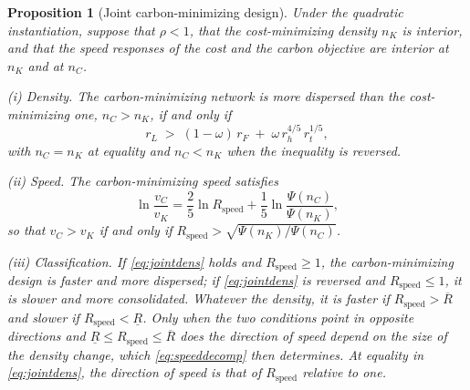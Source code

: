 \documentclass[11pt]{article}
\newtheorem{proposition}{Proposition}
\theoremstyle{definition}
\theoremstyle{remark}
\theoremstyle{plain}
\begin{document}
\begin{proposition}[Joint carbon-minimizing design]\label{prop:classify}
Under the quadratic instantiation, suppose that $\rho<1$, that the cost-minimizing density $n_K$ is interior,
and that the speed responses of the cost and the carbon objective are interior at $n_K$ and at $n_C$.

\smallskip\noindent\textup{(i)} \emph{Density.} The carbon-minimizing network is more dispersed than the
cost-minimizing one, $n_C>n_K$, if and only if
\begin{equation}\label{eq:jointdens}
  r_L\;>\;(1-\omega)\,r_F\;+\;\omega\,r_h^{4/5}\,r_t^{1/5},
\end{equation}
with $n_C=n_K$ at equality and $n_C<n_K$ when the inequality is reversed.

\smallskip\noindent\textup{(ii)} \emph{Speed.} The carbon-minimizing speed satisfies
\begin{equation}\label{eq:speeddecomp}
  \ln\frac{v_C}{v_K}=\frac25\ln R_{\mathrm{speed}}+\frac15\ln\frac{\Psi(n_C)}{\Psi(n_K)},
\end{equation}
so that $v_C>v_K$ if and only if $R_{\mathrm{speed}}>\sqrt{\Psi(n_K)/\Psi(n_C)}$.

\smallskip\noindent\textup{(iii)} \emph{Classification.} If \eqref{eq:jointdens} holds and
$R_{\mathrm{speed}}\ge1$, the carbon-minimizing design is faster and more dispersed; if \eqref{eq:jointdens} is
reversed and $R_{\mathrm{speed}}\le1$, it is slower and more consolidated. Whatever the density, it is faster
if $R_{\mathrm{speed}}>\overline R$ and slower if $R_{\mathrm{speed}}<\underline R$. Only when the two
conditions point in opposite directions and $\underline R\le R_{\mathrm{speed}}\le\overline R$ does the
direction of speed depend on the size of the density change, which \eqref{eq:speeddecomp} then determines. At
equality in \eqref{eq:jointdens}, the direction of speed is that of $R_{\mathrm{speed}}$ relative to one.
\end{proposition}
\end{document}
